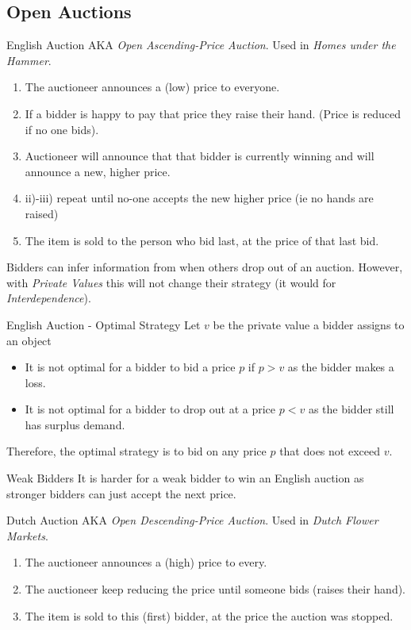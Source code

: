 \documentclass[11pt,a4paper]{article}
\begin{document}
\subsection{Open Auctions}

  \begin{definition}{English Auction}
    AKA \textit{Open Ascending-Price Auction}. Used in \textit{Homes under the Hammer}.
    \begin{enumerate}
      \item The auctioneer announces a (low) price to everyone.
      \item If a bidder is happy to pay that price they raise their hand. (Price is reduced if no one bids).
      \item Auctioneer will announce that that bidder is currently winning and will announce a new, higher price.
      \item ii)-iii) repeat until no-one accepts the new higher price (ie no hands are raised)
      \item The item is sold to the person who bid last, at the price of that last bid.
    \end{enumerate}
    Bidders can infer information from when others drop out of an auction. However, with \textit{Private Values} this will not change their strategy (it would for \textit{Interdependence}).
  \end{definition}

  \begin{proposition}{English Auction - Optimal Strategy}
    Let $v$ be the private value a bidder assigns to an object
    \begin{itemize}
      \item It is not optimal for a bidder to bid a price $p$ if $p>v$ as the bidder makes a loss.
      \item It is not optimal for a bidder to drop out at a price $p<v$ as the bidder still has surplus demand.
    \end{itemize}
    Therefore, the optimal strategy is to bid on any price $p$ that does not exceed $v$.
  \end{proposition}

  \begin{remark}{Weak Bidders}
    It is harder for a weak bidder to win an English auction as stronger bidders can just accept the next price.
  \end{remark}

  \begin{definition}{Dutch Auction}
    AKA \textit{Open Descending-Price Auction}. Used in \textit{Dutch Flower Markets}.
    \begin{enumerate}
      \item The auctioneer announces a (high) price to every.
      \item The auctioneer keep reducing the price until someone bids (raises their hand).
      \item The item is sold to this (first) bidder, at the price the auction was stopped.
    \end{enumerate}
  \end{definition}
\end{document}
